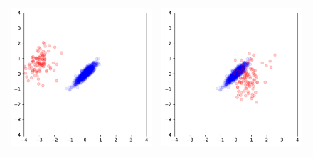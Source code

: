 \documentclass[12pt]{article}
\newcommand{\figw}{7cm}
\begin{document}
\begin{figure}
\centering
\begin{tabular}{cc}
  \includegraphics[width=\figw]{hw2/codes/gan/plots/alternating/0.pdf} &   \includegraphics[width=\figw]{hw2/codes/gan/plots/alternating/1.pdf} \\

\end{tabular}
\end{figure}
\end{document}
